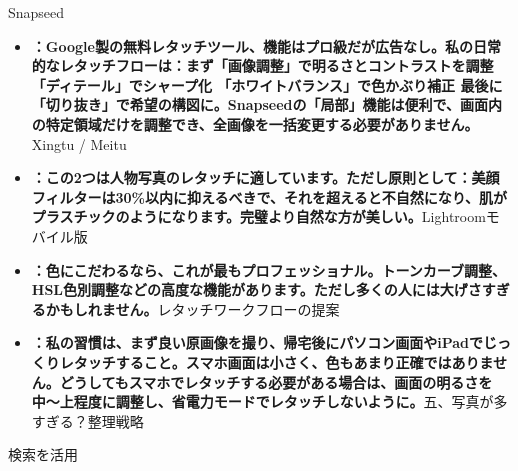 
Snapseed

\begin{itemize}
  \item \textbf{：Google製の無料レタッチツール、機能はプロ級だが広告なし。私の日常的なレタッチフローは：まず「画像調整」で明るさとコントラストを調整 「ディテール」でシャープ化 「ホワイトバランス」で色かぶり補正 最後に「切り抜き」で希望の構図に。Snapseedの「局部」機能は便利で、画面内の特定領域だけを調整でき、全画像を一括変更する必要がありません。}Xingtu / Meitu
  \item \textbf{：この2つは人物写真のレタッチに適しています。ただし原則として：美顔フィルターは30\%以内に抑えるべきで、それを超えると不自然になり、肌がプラスチックのようになります。完璧より自然な方が美しい。}Lightroomモバイル版
  \item \textbf{：色にこだわるなら、これが最もプロフェッショナル。トーンカーブ調整、HSL色別調整などの高度な機能があります。ただし多くの人には大げさすぎるかもしれません。}レタッチワークフローの提案
  \item \textbf{：私の習慣は、まず良い原画像を撮り、帰宅後にパソコン画面やiPadでじっくりレタッチすること。スマホ画面は小さく、色もあまり正確ではありません。どうしてもスマホでレタッチする必要がある場合は、画面の明るさを中〜上程度に調整し、省電力モードでレタッチしないように。}五、写真が多すぎる？整理戦略
\end{itemize}


検索を活用

